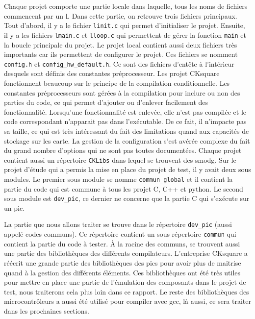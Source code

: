 \documentclass[a4paper]{article}
\begin{document}
Chaque projet comporte une partie locale dans laquelle, tous les noms de
fichiers commencent par un \textbf{l}. Dans cette partie, on retrouve trois
fichiers principaux. Tout d'abord, il y a le fichier \verb|linit.c| qui permet
d'initialiser le projet. Ensuite, il y a les fichiers \verb|lmain.c| et
\verb|lloop.c| qui permettent de gérer la fonction \verb|main| et la boucle
principale du projet. Le projet local contient aussi deux fichiers très
importants car ils permettent de configurer le projet. Ces fichiers se nomment
\verb|config.h| et \verb|config_hw_default.h|. Ce sont des fichiers d'entête à
l'intérieur desquels sont définis des constantes préprocesseur. Les projet
CKsquare fonctionnent beaucoup sur le principe de la compilation conditionnelle.
Les constantes préprocesseurs sont gérées à la compilation pour inclure ou non
des parties du code, ce qui permet d'ajouter ou d'enlever facilement des
fonctionnalité. Lorsqu'une fonctionnalité est enlevée, elle n'est pas compilée
et le code correspondant n'apparait pas dans l'exécutable. De ce fait, il
n'impacte pas sa taille, ce qui est très intéressant du fait des limitations
quand aux capacités de stockage sur les carte. La gestion de la configuration
s'est avérée complexe du fait du grand nombre d'options qui ne sont pas toutes
documentées. Chaque projet contient aussi un répertoire \verb|CKLibs| dans
lequel se trouvent des \gls{smodg}. Sur le projet d'étude qui a permis la mise
en place du projet de test, il y avait deux sous modules. Le premier sous module
se nomme \verb|commun_global| et il contient la partie du code qui est commune à
tous les projet C, C++ et python. Le second sous module est \verb|dev_pic|, ce
dernier ne concerne que la partie C qui s'exécute sur un \gls{pic}.

La partie que nous allons traiter se trouve dans le répertoire \verb|dev_pic|
(aussi appelé codes communs). Ce répertoire contient un sous répertoire
\verb|commun| qui contient la partie du code à tester. À la racine des communs,
se trouvent aussi une partie des bibliothèques des différents compilateurs.
L'entreprise CKsquare a réécrit une grande partie des bibliothèques des
\gls{pic}s pour avoir plus de maitrise quand à la gestion des différents
éléments. Ces bibliothèques ont été très utiles pour mettre en place une partie
de l'émulation des composants dans le projet de test, nous traiterons cela plus
loin dans ce rapport. Le reste des bibliothèques des microcontrôleurs a aussi
été utilisé pour compiler avec gcc, là aussi, ce sera traiter dans les
prochaines sections.
\end{document}
